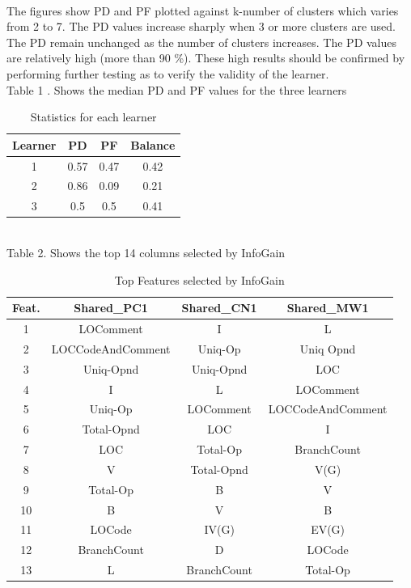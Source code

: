 \documentclass{sig-alternate}
\begin{document}
\\The figures show PD and PF plotted against k-number of clusters which varies from 2 to 7. The PD values increase sharply when 3 or more clusters are used. The PD remain unchanged as the number of clusters increases. The PD values are relatively high (more than 90 \%). These high results should be confirmed by performing further testing as to verify the validity of the learner. 
\\Table 1 . Shows the median PD and PF values for the three learners 

\begin{table}
\centering
\caption{Statistics for each learner}
\begin{tabular}{|c|c|c|c|} \hline
Learner&PD&PF&Balance\\\hline
1& 0.57 & 0.47 & 0.42 \\ \hline
2& 0.86 & 0.09 & 0.21 \\ \hline
3& 0.5  &0.5  & 0.41 \\ \hline
\end{tabular}
\end{table}

\\Table  2. Shows the top 14 columns selected by InfoGain

\begin{table}
\centering
\caption{Top Features selected by InfoGain}
\begin{tabular}{|c|c|c|c|} \hline
Feat.&Shared_PC1&Shared_CN1&Shared_MW1\\\hline
1& LOComment & I & L\\ \hline
2& LOCCodeAndComment & Uniq-Op & Uniq Opnd\\ \hline
3& Uniq-Opnd & Uniq-Opnd & LOC\\ \hline
4&  I & L & LOComment\\ \hline
5& Uniq-Op & LOComment & LOCCodeAndComment\\ \hline
6& Total-Opnd & LOC & I\\ \hline
7& LOC & Total-Op & BranchCount\\ \hline
8& V & Total-Opnd & V(G)\\ \hline
9& Total-Op & B & V\\ \hline
10& B & V & B\\ \hline
11& LOCode & IV(G) & EV(G)\\ \hline
12& BranchCount & D & LOCode\\ \hline
13& L & BranchCount & Total-Op\\ \hline

\hline\end{tabular}
\end{table}
\end{document}
